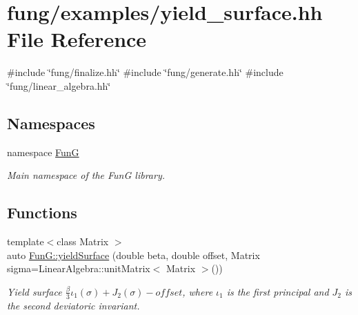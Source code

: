 \hypertarget{yield__surface_8hh}{\section{fung/examples/yield\-\_\-surface.hh \-File \-Reference}
\label{yield__surface_8hh}
}
{\ttfamily \#include \char`\"{}fung/finalize.\-hh\char`\"{}}\*
{\ttfamily \#include \char`\"{}fung/generate.\-hh\char`\"{}}\*
{\ttfamily \#include \char`\"{}fung/linear\-\_\-algebra.\-hh\char`\"{}}\*
\subsection*{\-Namespaces}
\begin{DoxyCompactItemize}
\item 
namespace \hyperlink{namespaceFunG}{\-Fun\-G}
\begin{DoxyCompactList}\small\item\em \-Main namespace of the \-Fun\-G library. \end{DoxyCompactList}\end{DoxyCompactItemize}
\subsection*{\-Functions}
\begin{DoxyCompactItemize}
\item 
{\footnotesize template$<$class Matrix $>$ }\\auto \hyperlink{namespaceFunG_a4784211358c877f05ad9426850303273}{\-Fun\-G\-::yield\-Surface} (double beta, double offset, \-Matrix sigma=\-Linear\-Algebra\-::unit\-Matrix$<$ \-Matrix $>$())
\begin{DoxyCompactList}\small\item\em \-Yield surface $ \frac{\beta}{3}\iota_1(\sigma) + J_2(\sigma)-offset $, where $\iota_1$ is the first principal and $J_2$ is the second deviatoric invariant. \end{DoxyCompactList}\end{DoxyCompactItemize}
